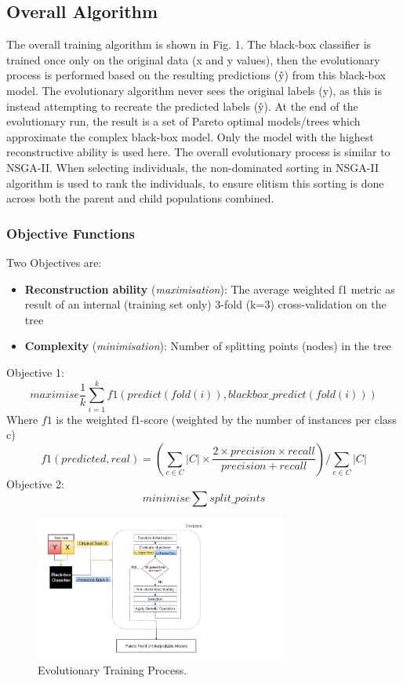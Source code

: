 \subsection{Overall Algorithm}
The overall training algorithm is shown in Fig. 1. The black-box classifier is trained once only on the original data (x and y values), then the evolutionary process is performed based on the resulting predictions (\^{y}) from this black-box model. The evolutionary algorithm never sees the original labels (y), as this is instead attempting to recreate the predicted labels (\^{y}). At the end of the evolutionary run, the result is a set of Pareto optimal models/trees which approximate the complex black-box model. Only the model with the highest reconstructive ability is used here. The overall evolutionary process is similar to NSGA-II. When selecting individuals, the non-dominated sorting in NSGA-II algorithm is used to rank the individuals, to ensure elitism this sorting is done across both the parent and child populations combined. 
\subsubsection{Objective Functions}
Two Objectives are:
\begin{itemize}
\item \textbf{Reconstruction ability} (\textit{maximisation}): The average weighted f1 metric as result of an internal (training set only) 3-fold (k=3) cross-validation on the tree
\end{itemize}
\begin{itemize}
\item \textbf{Complexity} (\textit{minimisation}): Number of splitting points (nodes) in the tree
\end{itemize}
Objective 1:
\begin{equation} \label{eq:obj1}
maximise \frac {1}{k} \sum_{i=1}^k f1(predict(fold(i)),blackbox\_predict(fold(i)))
\end{equation}
Where $f1$ is the weighted f1-score (weighted by the number of instances per class c)
\begin{displaymath}
f1(predicted, real) = (\sum_{c\in C} |C| \times \frac{2\times precision\times recall}{precision+recall})/\sum_{c\in C} |C|
\end{displaymath}
Objective 2:
\begin{equation}
minimise \sum split\_points
\end{equation}
\begin{figure}
\includegraphics[width=0.75\textwidth]{evolution_process_resized}
\caption{Evolutionary Training Process.}
\end{figure}

